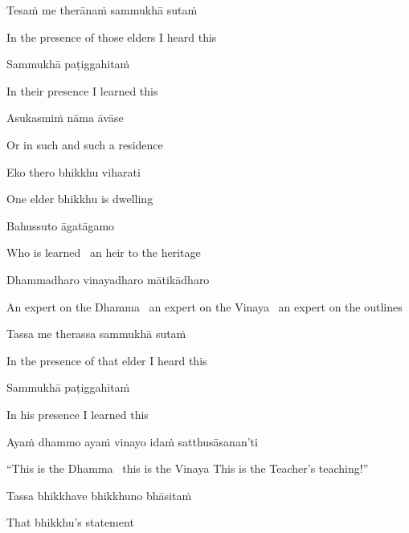 Tesaṁ me therānaṁ sammukhā sutaṁ

\begin{cprenglish}
  In the presence of those elders I heard this
\end{cprenglish}

Sammukhā paṭiggahitaṁ

\begin{cprenglish}
  In their presence I learned this
\end{cprenglish}

Asukasmiṁ nāma āvāse

\begin{cprenglish}
  Or in such and such a residence
\end{cprenglish}

Eko thero bhikkhu viharati

\begin{cprenglish}
  One elder bhikkhu is dwelling
\end{cprenglish}

Bahussuto āgatāgamo

\begin{cprenglish}
  Who is learned \breathmark\ an heir to the heritage
\end{cprenglish}

Dhammadharo vinayadharo mātikādharo

\begin{cprenglish}
  An expert on the Dhamma \breathmark\ an expert on the Vinaya \breathmark\ an expert on the outlines
\end{cprenglish}

Tassa me therassa sammukhā sutaṁ

\begin{cprenglish}
  In the presence of that elder I heard this
\end{cprenglish}

Sammukhā paṭiggahitaṁ

\begin{cprenglish}
  In his presence I learned this
\end{cprenglish}

Ayaṁ dhammo ayaṁ vinayo idaṁ satthusāsanan’ti

\begin{cprenglish}
  “This is the Dhamma \breathmark\ this is the Vinaya
  This is the Teacher’s teaching!”
\end{cprenglish}

Tassa bhikkhave bhikkhuno bhāsitaṁ

\begin{cprenglish}
  That bhikkhu’s statement
\end{cprenglish}

